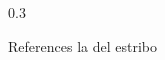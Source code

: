 \documentclass[final]{beamer}\usepackage[]{graphicx}\usepackage[]{color}
\newlength{\twocolwid}
\newlength{\threecolwid}
\begin{document}
\begin{frame}
\begin{columns}[t,totalwidth=\threecolwid]
\begin{column}{\twocolwid}
\begin{block}
\begin{columns}[t,totalwidth=0.99\twocolwid ]
        \begin{column}{0.5cm}\end{column}      %
        
        \begin{column}{0.3\twocolwid} 
              \begin{alertblock}{References}
                  la del estribo
              \end{alertblock}
        \end{column}
        
        \end{columns}
      \end{block}


\end{column}


\end{columns}
\end{frame}
\end{document}
